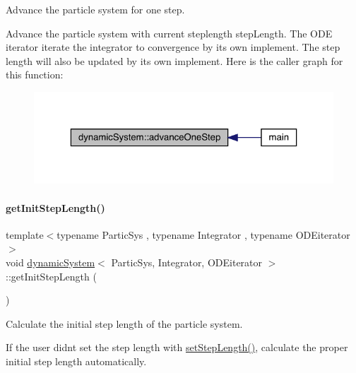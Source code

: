 Advance the particle system for one step. 

Advance the particle system with current steplength step\+Length. The O\+DE iterator iterate the integrator to convergence by its own implement. The step length will also be updated by its own implement. Here is the caller graph for this function\+:\nopagebreak
\begin{figure}[H]
\begin{center}
\leavevmode
\includegraphics[width=323pt]{classdynamic_system_a3b6569e359c6451a038107455903c6a1_icgraph}
\end{center}
\end{figure}
\mbox{\label{classdynamic_system_a9009d61ca09844f016ebc0d87467dba3}} 
\paragraph{\texorpdfstring{get\+Init\+Step\+Length()}{getInitStepLength()}}
{\footnotesize\ttfamily template$<$typename Partic\+Sys , typename Integrator , typename O\+D\+Eiterator $>$ \\
void \mbox{\hyperlink{classdynamic_system}{dynamic\+System}}$<$ Partic\+Sys, Integrator, O\+D\+Eiterator $>$\+::get\+Init\+Step\+Length (\begin{DoxyParamCaption}{ }\end{DoxyParamCaption})\hspace{0.3cm}{\ttfamily [private]}}



Calculate the initial step length of the particle system. 

If the user didn\textquotesingle{}t set the step length with \mbox{\hyperlink{classdynamic_system_af1b1ccfa965c677bd66029b42377117d}{set\+Step\+Length()}}, calculate the proper initial step length automatically. \mbox{\label{classdynamic_system_a44849a58489dd8c300edc920f793c56a}} 
